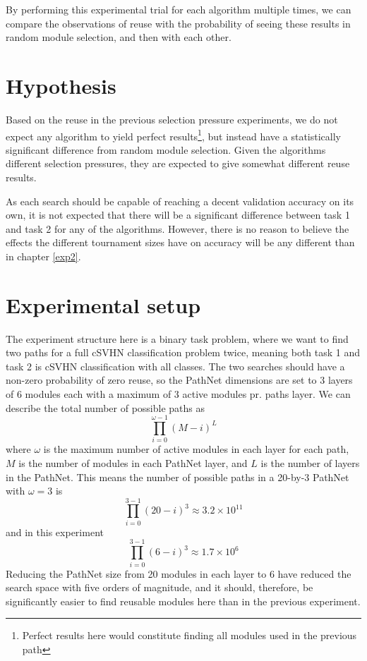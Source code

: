 By performing this experimental trial for each algorithm multiple times, we can compare the observations of reuse with the probability of seeing these results in random module selection, and then with each other. 

\section{Hypothesis}
Based on the reuse in the previous selection pressure experiments, we do not expect any algorithm to yield perfect results\footnote{Perfect results here would constitute finding all modules used in the previous path}, but instead have a statistically significant difference from random module selection. Given the algorithms different selection pressures, they are expected to give somewhat different reuse results.

As each search should be capable of reaching a decent validation accuracy on its own, it is not expected that there will be a significant difference between task 1 and task 2 for any of the algorithms. However, there is no reason to believe the effects the different tournament sizes have on accuracy will be any different than in chapter \ref{exp2}. 

\section{Experimental setup}
\label{exp3:implementation}
The experiment structure here is a binary task problem, where we want to find two paths for a full cSVHN classification problem twice, meaning both task 1 and task 2 is cSVHN classification with all classes. The two searches should have a non-zero probability of zero reuse, so the PathNet dimensions are set to 3 layers of 6 modules each with a maximum of 3 active modules pr. paths layer. We can describe the total number of possible paths as 
\begin{equation*}
    \prod_{i=0}^{\omega-1}(M-i)^{L}
\end{equation*}
where \(\omega\) is the maximum number of active modules in each layer for each path, \(M\) is the number of modules in each PathNet layer, and  \(L\) is the number of layers in the PathNet. This means the number of possible paths in a 20-by-3 PathNet with \(\omega=3\) is  
\begin{equation*}
    \prod_{i=0}^{3-1}(20-i)^{3}\approx 3.2\times10^{11}
\end{equation*}
and in this experiment
\begin{equation*}
    \prod_{i=0}^{3-1}(6-i)^{3}\approx 1.7\times10^{6}
\end{equation*}
Reducing the PathNet size from 20 modules in each layer to 6 have reduced the search space with five orders of magnitude, and it should, therefore, be significantly easier to find reusable modules here than in the previous experiment.

